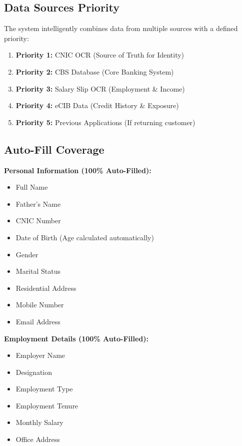 \documentclass[12pt,a4paper]{article}
\begin{document}
\subsection{Data Sources Priority}

The system intelligently combines data from multiple sources with a defined priority:

\begin{enumerate}
    \item \textbf{Priority 1:} CNIC OCR (Source of Truth for Identity)
    \item \textbf{Priority 2:} CBS Database (Core Banking System)
    \item \textbf{Priority 3:} Salary Slip OCR (Employment \& Income)
    \item \textbf{Priority 4:} eCIB Data (Credit History \& Exposure)
    \item \textbf{Priority 5:} Previous Applications (If returning customer)
\end{enumerate}

\subsection{Auto-Fill Coverage}

\textbf{Personal Information (100\% Auto-Filled):}
\begin{itemize}[noitemsep]
    \item Full Name
    \item Father's Name
    \item CNIC Number
    \item Date of Birth (Age calculated automatically)
    \item Gender
    \item Marital Status
    \item Residential Address
    \item Mobile Number
    \item Email Address
\end{itemize}

\textbf{Employment Details (100\% Auto-Filled):}
\begin{itemize}[noitemsep]
    \item Employer Name
    \item Designation
    \item Employment Type
    \item Employment Tenure
    \item Monthly Salary
    \item Office Address
\end{itemize}
\end{document}
